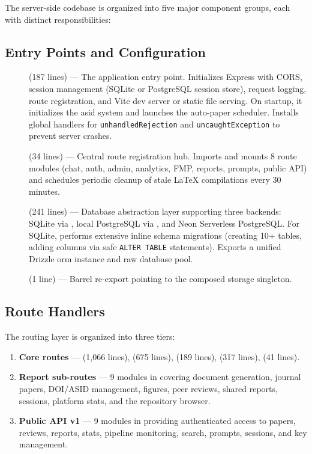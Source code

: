 The server-side codebase is organized into five major component groups, each with distinct responsibilities:

\subsection{Entry Points and Configuration}

\begin{description}
  \item[] (187 lines) --- The application entry point. Initializes Express with CORS, session management (SQLite or PostgreSQL session store), request logging, route registration, and Vite dev server or static file serving. On startup, it initializes the \gls{asid} system and launches the auto-paper scheduler. Installs global handlers for \texttt{unhandledRejection} and \texttt{uncaughtException} to prevent server crashes.

  \item[] (34 lines) --- Central route registration hub. Imports and mounts 8 route modules (chat, auth, admin, analytics, FMP, reports, prompts, public API) and schedules periodic cleanup of stale \LaTeX{} compilations every 30 minutes.

  \item[] (241 lines) --- Database abstraction layer supporting three backends: SQLite via , local PostgreSQL via , and Neon Serverless PostgreSQL. For SQLite, performs extensive inline schema migrations (creating 10+ tables, adding columns via safe \texttt{ALTER TABLE} statements). Exports a unified Drizzle \gls{orm} instance and raw database pool.

  \item[] (1 line) --- Barrel re-export pointing to the composed storage singleton.
\end{description}

\subsection{Route Handlers}

The routing layer is organized into three tiers:

\begin{enumerate}
  \item \textbf{Core routes} ---  (1,066 lines),  (675 lines),  (189 lines),  (317 lines),  (41 lines).

  \item \textbf{Report sub-routes} --- 9 modules in  covering document generation, journal papers, DOI/ASID management, figures, peer reviews, shared reports, sessions, platform stats, and the repository browser.

  \item \textbf{Public API v1} --- 9 modules in  providing authenticated access to papers, reviews, reports, stats, pipeline monitoring, search, prompts, sessions, and key management.
\end{enumerate}

